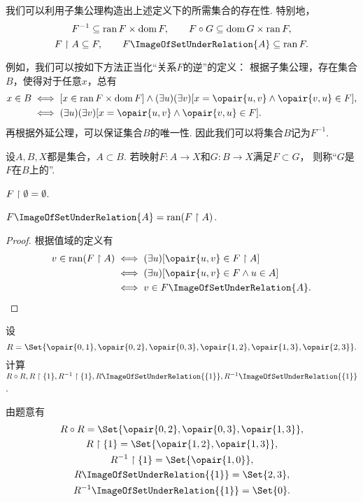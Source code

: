 我们可以利用子集公理构造出上述定义下的所需集合的存在性.
特别地，\[
	F^{-1} \subseteq \operatorname{ran} F \times \operatorname{dom} F, \qquad
	F \circ G \subseteq \operatorname{dom} G \times \operatorname{ran} F,
\]\[
	F \setrestrict A \subseteq F, \qquad
	F\ImageOfSetUnderRelation{A} \subseteq \ran F.
\]

例如，我们可以按如下方法正当化“关系\(F\)的逆”的定义：
根据子集公理，存在集合\(B\)，使得对于任意\(x\)，总有\begin{align*}
	x \in B
	&\iff
	[x \in \ran F \times \dom F]
	\land
	(\exists u)(\exists v)[x = \opair{u,v} \land \opair{v,u} \in F], \\
	&\iff
	(\exists u)(\exists v)[x = \opair{u,v} \land \opair{v,u} \in F].
\end{align*}
再根据外延公理，可以保证集合\(B\)的唯一性.
因此我们可以将集合\(B\)记为\(F^{-1}\).

\begin{definition}
设\(A,B,X\)都是集合，\(A \subset B\).
若映射\(F\colon A \to X\)和\(G\colon B \to X\)满足\(F \subset G\)，
则称“\(G\)是\(F\)在\(B\)上的”.
\end{definition}

\begin{theorem}
\(F \upharpoonright \emptyset = \emptyset\).
\end{theorem}

\begin{theorem}
\(F\ImageOfSetUnderRelation{A} = \ran(F \setrestrict A)\).
\begin{proof}
根据值域的定义有\begin{align*}
	v \in \ran(F \setrestrict A)
	&\iff
	(\exists u)[\opair{u,v} \in F \setrestrict A] \\
	&\iff
	(\exists u)[\opair{u,v} \in F \land u \in A] \\
	&\iff
	v \in F\ImageOfSetUnderRelation{A}.
	\qedhere
\end{align*}
\end{proof}
\end{theorem}

\begin{example}
设\[
	R = \Set{
		\opair{0,1},
		\opair{0,2},
		\opair{0,3},
		\opair{1,2},
		\opair{1,3},
		\opair{2,3}
	}.
\]
计算\(R \circ R,
R \setrestrict \{1\},
R^{-1} \setrestrict \{1\},
R\ImageOfSetUnderRelation{\{1\}},
R^{-1}\ImageOfSetUnderRelation{\{1\}}\).
\begin{solution}
由题意有\begin{gather*}
	R \circ R
	= \Set{
		\opair{0,2},
		\opair{0,3},
		\opair{1,3}
	}, \\
	R \setrestrict \{1\}
	= \Set{
		\opair{1,2},
		\opair{1,3}
	}, \\
	R^{-1} \setrestrict \{1\}
	= \Set{
		\opair{1,0}
	}, \\
	R\ImageOfSetUnderRelation{\{1\}}
	= \Set{
		2,
		3
	}, \\
	R^{-1}\ImageOfSetUnderRelation{\{1\}}
	= \Set{
		0
	}.
\end{gather*}
\end{solution}
\end{example}


